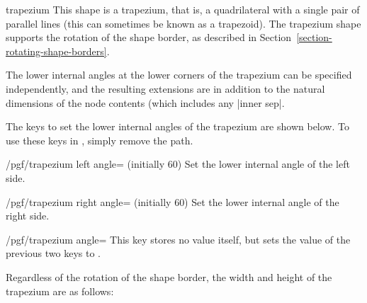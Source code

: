 \begin{shape}{trapezium}
  This shape is a trapezium, that is, a quadrilateral with a single
  pair of parallel lines (this can sometimes be known as a trapezoid).
  The trapezium shape supports the rotation of the shape border, as
  described in Section~\ref{section-rotating-shape-borders}.

  The lower internal angles at the lower corners of the trapezium can
  be specified independently, and the resulting extensions are in
  addition to the natural dimensions of the node contents (which
  includes any |inner sep|.
	
\begin{codeexample}[]
\end{codeexample}


  The \pgfname{} keys to set the lower internal angles of the trapezium
  are shown below.
  To use these keys in \tikzname, simply remove the  path.
	
  \begin{key}{/pgf/trapezium left angle= (initially 60)}
    Set the lower internal angle of the left side.
  \end{key}

  \begin{key}{/pgf/trapezium right angle= (initially 60)}
    Set the lower internal angle of the right side.
  \end{key}

  \begin{stylekey}{/pgf/trapezium angle=}
    This key stores no value itself, but sets the value of the
    previous two keys to .
  \end{stylekey}

  Regardless of the rotation of the shape border, the width
  and height of the trapezium are as follows:

\begin{codeexample}[]
\end{codeexample}


\end{shape}
